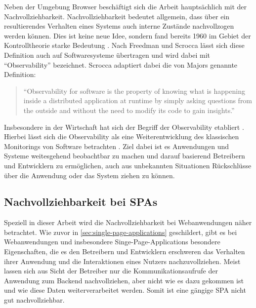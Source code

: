 Neben der Umgebung Browser beschäftigt sich die Arbeit hauptsächlich mit der Nachvollziehbarkeit. Nachvollziehbarkeit bedeutet allgemein, dass über ein resultierendes Verhalten eines Systems auch interne Zustände nachvollzogen werden können. Dies ist keine neue Idee, sondern fand bereits 1960 im Gebiet der Kontrolltheorie starke Bedeutung \cite{OnTheGeneralTheoryOfControlSystems}. Nach Freedman \cite{TestabilityOfSoftwareComponents} und Scrocca \etal \cite{TheKaijuProjectPaper} lässt sich diese Definition auch auf Softwaresysteme übertragen und wird dabei mit \enquote{Observability} bezeichnet. Scrocca adaptiert dabei die von Majors \cite{MajorsObservability} genannte Definition:

\begin{quotation}
\enquote{Observability for software is the property of knowing what is happening inside a distributed application at runtime by simply asking questions from the outside and without the need to modify its code to gain insights.}
\end{quotation}

Insbesondere in der Wirtschaft hat sich der Begriff der Observability etabliert \cite{DynatraceObservability} \cite{NewRelicObservability}. Hierbei lässt sich die Observability als eine Weiterentwicklung des klassischen Monitorings von Software betrachten \cite{TheNewStackMonitoringAndObservability}. Ziel dabei ist es Anwendungen und Systeme weitesgehend beobachtbar zu machen und darauf basierend Betreibern und Entwicklern zu ermöglichen, auch aus unbekannten Situationen Rückschlüsse über die Anwendung oder das System ziehen zu können.

\subsection{Nachvollziehbarkeit bei SPAs}
\label{sec:nachvollziehbarkeit-bei-spas}

Speziell in dieser Arbeit wird die Nachvollziehbarkeit bei Webanwendungen näher betrachtet. Wie zuvor in \autoref{sec:single-page-applications} geschildert, gibt es bei Webanwendungen und insbesondere Singe-Page-Applications besondere Eigenschaften, die es den Betreibern und Entwicklern erschweren das Verhalten ihrer Anwendung und die Interaktionen eines Nutzers nachzuvollziehen. Meist lassen sich aus Sicht der Betreiber nur die Kommunikationsaufrufe der Anwendung zum Backend nachvollziehen, aber nicht wie es dazu gekommen ist und wie diese Daten weiterverarbeitet werden. Somit ist eine gängige SPA nicht gut nachvollziehbar.

